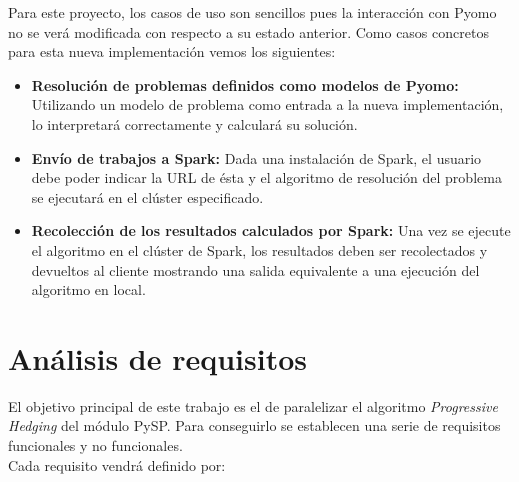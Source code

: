 Para este proyecto, los casos de uso son sencillos pues la interacción con Pyomo no se verá modificada con respecto a su estado anterior. Como casos concretos para esta nueva implementación vemos los siguientes:

\begin{itemize}
    \item \textbf{Resolución de problemas definidos como modelos de Pyomo: } Utilizando un modelo de problema como entrada a la nueva implementación, lo interpretará correctamente y calculará su solución.
    \item \textbf{Envío de trabajos a Spark: } Dada una instalación de Spark, el usuario debe poder indicar la URL de ésta y el algoritmo de resolución del problema se ejecutará en el clúster especificado.
    \item \textbf{Recolección de los resultados calculados por Spark: } Una vez se ejecute el algoritmo en el clúster de Spark, los resultados deben ser recolectados y devueltos al cliente mostrando una salida equivalente a una ejecución del algoritmo en local.
\end{itemize}

\section{Análisis de requisitos}

El objetivo principal de este trabajo es el de paralelizar el algoritmo \textit{Progressive Hedging} del módulo PySP. Para conseguirlo se establecen una serie de requisitos funcionales y no funcionales.\\

Cada requisito vendrá definido por:

